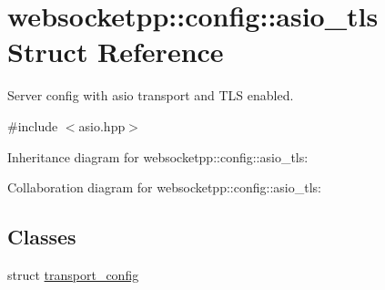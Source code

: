\hypertarget{structwebsocketpp_1_1config_1_1asio__tls}{}\section{websocketpp\+:\+:config\+:\+:asio\+\_\+tls Struct Reference}
\label{structwebsocketpp_1_1config_1_1asio__tls}


Server config with asio transport and T\+LS enabled.  




{\ttfamily \#include $<$asio.\+hpp$>$}



Inheritance diagram for websocketpp\+:\+:config\+:\+:asio\+\_\+tls\+:


Collaboration diagram for websocketpp\+:\+:config\+:\+:asio\+\_\+tls\+:
\subsection*{Classes}
\begin{DoxyCompactItemize}
\item 
struct \mbox{\hyperlink{structwebsocketpp_1_1config_1_1asio__tls_1_1transport__config}{transport\+\_\+config}}
\end{DoxyCompactItemize}
